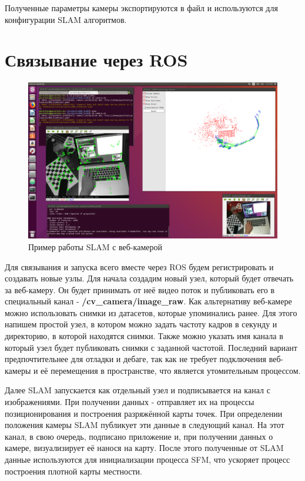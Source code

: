 Полученные параметры камеры экспортируются в файл и используются для конфигурации SLAM алгоритмов.

\section{Связывание через ROS}

\begin{figure}[h]
    \centering
    \includegraphics[width=1.0\textwidth]{images/ros-slam.png}
    \caption{Пример работы SLAM с веб-камерой}
    \label{fig:ros-slam}
\end{figure}

Для связывания и запуска всего вместе через ROS будем регистрировать и создавать новые узлы. Для начала создадим новый узел, который будет отвечать за веб-камеру. Он будет принимать от неё видео поток и публиковать его в специальный канал - \textbf{/cv\_camera/image\_raw}. Как альтернативу веб-камере можно использовать снимки из датасетов, которые упоминались ранее. Для этого напишем простой узел, в котором можно задать частоту кадров в секунду и директорию, в которой находятся снимки. Также можно указать имя канала в который узел будет публиковать снимки с заданной частотой. Последний вариант предпочтительнее для отладки и дебаге, так как не требует подключения веб-камеры и её перемещения в пространстве, что является утомительным процессом.

Далее SLAM запускается как отдельный узел и подписывается на канал с изображениями. При получении данных - отправляет их на процессы позиционирования и построения разряжённой карты точек. При определении положения камеры SLAM публикует эти данные в следующий канал. На этот канал, в свою очередь, подписано приложение и, при получении данных о камере, визуализирует её нанося на карту. После этого полученные от SLAM данные используются для инициализации процесса SFM, что ускоряет процесс построения плотной карты местности.